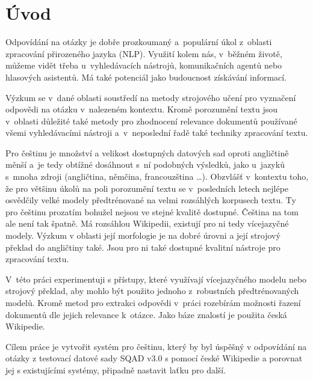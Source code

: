 
\chapter{Úvod}
Odpovídání na otázky je dobře prozkoumaný a~populární úkol z~oblasti zpracování přirozeného jazyka (NLP). Využití kolem nás, v~běžném životě, můžeme vidět třeba u~vyhledávacích nástrojů, komunikačních agentů nebo hlasových asistentů. Má také potenciál jako budoucnost získávání informací.\par 
Výzkum se v~dané oblasti soustředí na metody strojového učení pro vyznačení odpovědi na otázku v~nalezeném kontextu. Kromě porozumění textu jsou v~oblasti důležité také metody pro zhodnocení relevance dokumentů používané všemi vyhledávacími nástroji a~v~neposlední řadě také techniky zpracování textu.\par
Pro češtinu je množství a velikost dostupných datových sad oproti angličtině měnší a~je tedy obtížné dosáhnout s~ní podobných výsledků, jako u~jazyků s~mnoha zdroji (angličtina, němčina, francouzština \dots). Obzvlášť v~kontextu toho, že pro většinu úkolů na poli porozumění textu se v~posledních letech nejlépe osvědčily velké modely předtrénované na velmi rozsáhlých korpusech textu. Ty pro češtinu prozatím bohužel nejsou ve stejné kvalitě dostupné. Čeština na tom ale není tak špatně. Má rozsáhlou Wikipedii, existují pro ni tedy vícejazyčné modely. Výzkum v oblasti její morfologie je na dobré úrovni a její strojový překlad do angličtiny také. Jsou pro ni také dostupné kvalitní nástroje pro zpracování textu.\par \smallskip
V~této práci experimentuji s přístupy, které využívají vícejazyčného modelu nebo strojový překlad, aby mohlo být použito jednoho z~robustních předtrénovaných modelů. Kromě metod pro extrakci odpovědi v~práci rozebírám možnosti řazení dokumentů dle jejich relevance k~otázce. Jako báze znalostí je použita česká Wikipedie.\par
Cílem práce je vytvořit systém pro češtinu, který by byl úspěšný v odpovídání na otázky z testovací datové sady SQAD v3.0 s pomocí české Wikipedie a porovnat jej s existujícími systémy, připadně nastavit laťku pro další.\par \smallskip
